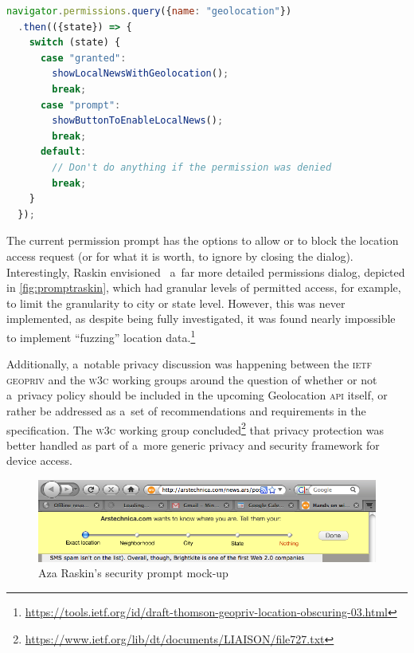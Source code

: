 \documentclass[sigconf,hyphens]{acmart}
\begin{document}
\begin{lstlisting}[caption={Asking for permission to use \texttt{GeolocationSensor}},
  label=code:prompt, language=JavaScript, float=h] 
navigator.permissions.query({name: "geolocation"})
  .then(({state}) => {
    switch (state) {
      case "granted":
        showLocalNewsWithGeolocation();
        break;
      case "prompt":
        showButtonToEnableLocalNews();
        break;
      default:
        // Don't do anything if the permission was denied
        break;
    }
  });
\end{lstlisting}

The current permission prompt has the options to allow or to block
the location access request (or for what it is worth, to ignore by closing the dialog).
Interestingly, Raskin envisioned~\cite{raskin2010geolocation} a~far more detailed permissions
dialog, depicted in \autoref{fig:promptraskin}, which had granular levels of permitted access,
for example, to limit the granularity to city or state level.
However, this was never implemented, as despite being fully investigated, it was found nearly impossible
to implement ``fuzzing'' location
data.\footnote{\url{https://tools.ietf.org/id/draft-thomson-geopriv-location-obscuring-03.html}}

Additionally, a~notable privacy discussion was happening between the \textsc{ietf} \textsc{geopriv}
and the \textsc{w3c} working groups around the question of whether or not
a~privacy policy should be included in the upcoming Geolocation \textsc{api} itself,
or rather be addressed as a~set of recommendations and requirements in the specification.
The \textsc{w3c} working group
concluded\footnote{\url{https://www.ietf.org/lib/dt/documents/LIAISON/file727.txt}}
that privacy protection was better handled
as part of a~more generic privacy and security framework for device access.

\begin{figure}[h]
  \includegraphics[width=\columnwidth]{mockup-prompt.png}
  \caption{Aza Raskin's security prompt mock-up~\cite{raskin2010geolocation}}
  \label{fig:promptraskin}
\end{figure}
\end{document}
